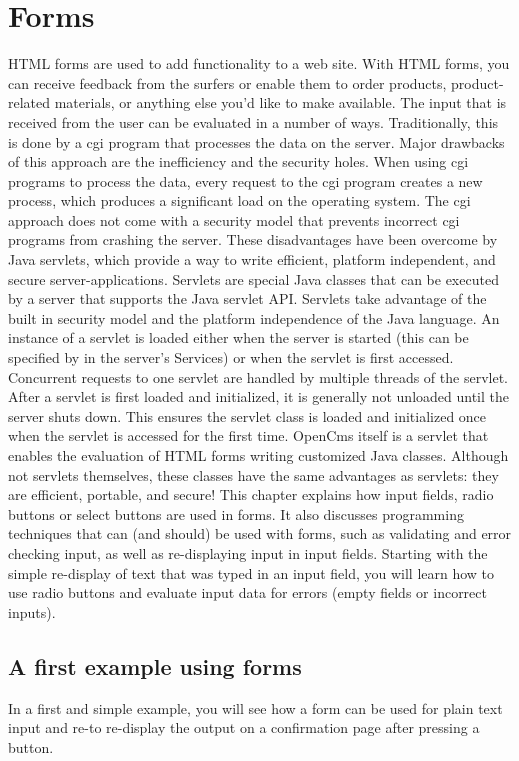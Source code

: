 \section{Forms}
HTML forms are used to add functionality to a web site. With HTML forms,
you can receive feedback from the surfers or enable them to order
products, product-related materials, or anything else you'd like to make
available.
The input that is received from the user can be evaluated in a number of
ways. Traditionally, this is done by a cgi program that processes the
data on the server. Major drawbacks of this approach are the
inefficiency and the security holes. When using cgi programs to process
the data, every request to the cgi program creates a new process, which
produces a significant load on the operating system. The cgi approach
does not come with a security model that prevents incorrect cgi programs
from crashing the server.
These disadvantages have been overcome by Java servlets, which provide a
way to write efficient, platform independent, and secure
server-applications. Servlets are special Java classes that can be
executed by a server that supports the Java servlet API. Servlets take
advantage of the built in security model and the platform independence
of the Java language. An instance of a servlet is loaded either when the
server is started (this can be specified by in the server's Services) or
when the servlet is first accessed. Concurrent requests to one servlet
are handled by multiple threads of the servlet. After a servlet is first
loaded and initialized, it is generally not unloaded until the server
shuts down. This ensures the servlet class is loaded and initialized
once when the servlet is accessed for the first time.
OpenCms itself is a servlet that enables the evaluation of HTML forms
writing customized Java classes. Although not servlets themselves, these
classes have the same advantages as servlets: they are efficient,
portable, and secure!
This chapter explains how input fields, radio buttons or select buttons
are used in forms. It also discusses programming techniques that can
(and should) be used with forms, such as validating and error checking
input, as well as re-displaying input in input fields. Starting with the
simple re-display of text that was typed in an input field, you will
learn how to use radio buttons and evaluate input data for errors
(empty fields or incorrect inputs).

\subsection {A first example using forms}
In a first and simple example, you will see how a form can be used for
plain text input and re-to re-display the output on a confirmation page
after pressing a button.

